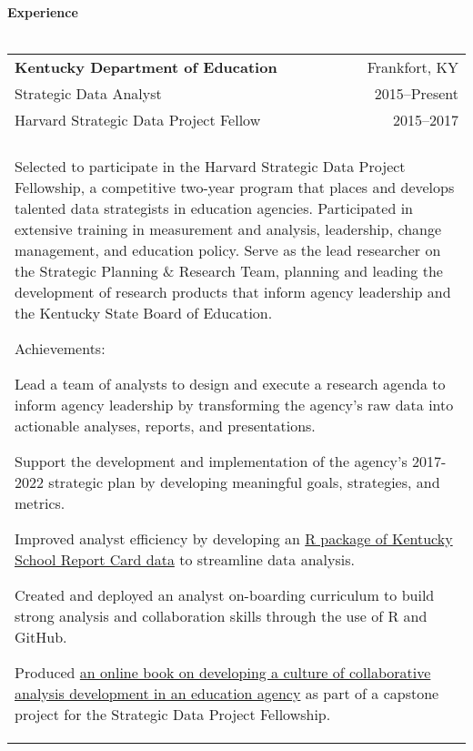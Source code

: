 \documentclass[letterpaper,11pt]{article}
\begin{document}
\begin{vwcol}[widths={0.2,0.8},sep=1.5cm,justify=flush,rule=0pt,indent=0em]
{\Large\bfseries\color{Blue}Experience} \\\\
\noindent\begin{tabular*}{0.7\textwidth}{l @{\extracolsep{\fill}} r}
  \textbf{Kentucky Department of Education} & \ {\color{Gray}Frankfort, KY} \\
  {\color{Gray}Strategic Data Analyst} & \ {\color{Gray}2015--Present}\\
  {\color{Gray}Harvard Strategic Data Project Fellow} & \ {\color{Gray}2015--2017}\\\\
  
  \multicolumn{2}{p{0.7\textwidth}}{Selected to participate in the Harvard Strategic Data Project Fellowship, a competitive two-year program that places and develops talented data strategists in education agencies. Participated in extensive training in measurement and analysis, leadership, change management, and education policy. Serve as the lead researcher on the Strategic Planning \& Research Team, planning and leading the development of research products that inform agency leadership and the Kentucky State Board of Education. 
  
  \vspace{5mm}
  Achievements:
  \begin{itemize*}
    \item Lead a team of analysts to design and execute a research agenda to inform agency leadership by transforming the agency's raw data into actionable analyses, reports, and presentations. 
    \item Support the development and implementation of the agency's 2017-2022 strategic plan by developing meaningful goals, strategies, and metrics.
    \item Improved analyst efficiency by developing an \href{http://www.github.com/alspur/kysrc}{R package of Kentucky School Report Card data} to streamline data analysis.
    \item Created and deployed an analyst on-boarding curriculum to build strong analysis and collaboration skills through the use of R and GitHub. 
    \item Produced \href{http://alspur.com/capstone-project/}{an online book on developing a culture of collaborative analysis development in an education agency} as part of a capstone project for the Strategic Data Project Fellowship.
  \end{itemize*}}
  

\end{tabular*}

\end{vwcol}
\end{document}
